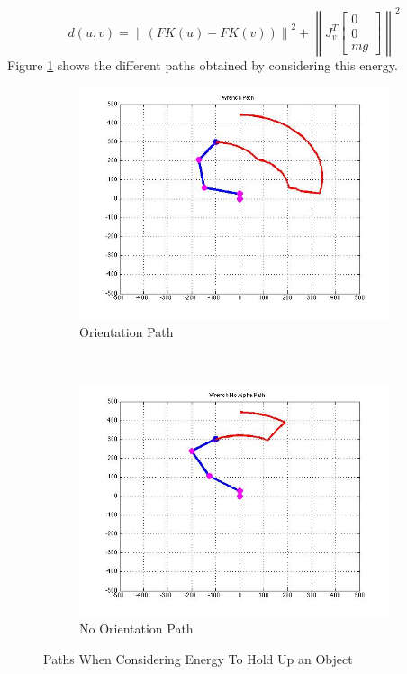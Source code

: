 \documentclass{article}
\newcommand{\bM}{\begin{bmatrix}}
\newcommand{\eM}{\end{bmatrix}}
\begin{document}
\[	d(u,v) =  \left\|(FK(u)-FK(v))\right\|^2 + \left\|J^T_v\bM 0 \\ 0 \\ mg \eM\right\|^2\]
Figure \ref{fig:EnergyPaths1} shows the different paths obtained by considering this energy. 
\begin{figure}[htb]
\centering
\begin{subfigure}[b]{0.5\textwidth}
\centering
\includegraphics[scale=.3]{PathPics/Wrench_Path.jpg}
\caption{Orientation Path}
\end{subfigure}%
~ 
\begin{subfigure}[b]{0.5\textwidth}
\centering
\includegraphics[scale=.3]{PathPics/Wrench_NoAlpha_Path.jpg}
\caption{No Orientation Path}
\end{subfigure}

\caption{Paths When Considering Energy To Hold Up an Object}
\label{fig:EnergyPaths1}
\end{figure}\\
\end{document}
